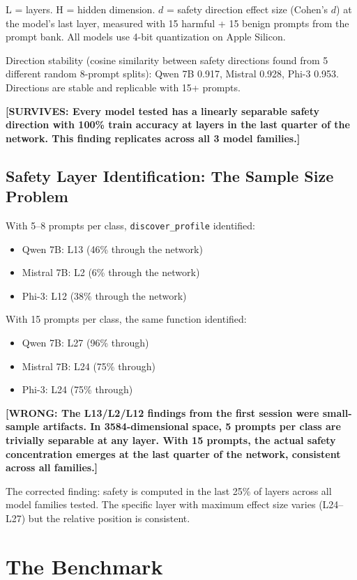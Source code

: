 \documentclass[11pt,a4paper]{article}
\newcommand{\wrong}[1]{\textcolor{wrong}{\textbf{[WRONG: #1]}}}
\newcommand{\surv}[1]{\textcolor{surv}{\textbf{[SURVIVES: #1]}}}
\begin{document}
L = layers. H = hidden dimension. $d$ = safety direction effect size (Cohen's $d$) at the model's last layer, measured with 15 harmful + 15 benign prompts from the prompt bank. All models use 4-bit quantization on Apple Silicon.

Direction stability (cosine similarity between safety directions found from 5 different random 8-prompt splits): Qwen 7B 0.917, Mistral 0.928, Phi-3 0.953. Directions are stable and replicable with 15+ prompts.

\surv{Every model tested has a linearly separable safety direction with 100\% train accuracy at layers in the last quarter of the network. This finding replicates across all 3 model families.}

\subsection{Safety Layer Identification: The Sample Size Problem}

With 5--8 prompts per class, \texttt{discover\_profile} identified:
\begin{itemize}[nosep]
\item Qwen 7B: L13 (46\% through the network)
\item Mistral 7B: L2 (6\% through the network)
\item Phi-3: L12 (38\% through the network)
\end{itemize}

With 15 prompts per class, the same function identified:
\begin{itemize}[nosep]
\item Qwen 7B: L27 (96\% through)
\item Mistral 7B: L24 (75\% through)
\item Phi-3: L24 (75\% through)
\end{itemize}

\wrong{The L13/L2/L12 findings from the first session were small-sample artifacts. In 3584-dimensional space, 5 prompts per class are trivially separable at any layer. With 15 prompts, the actual safety concentration emerges at the last quarter of the network, consistent across all families.}

The corrected finding: safety is computed in the last 25\% of layers across all model families tested. The specific layer with maximum effect size varies (L24--L27) but the relative position is consistent.

\section{The Benchmark}
\end{document}
